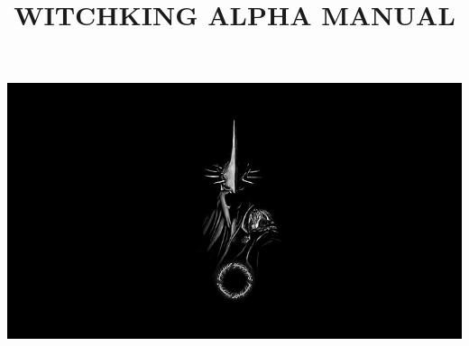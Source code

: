 \documentclass[11pt]{report}
\title{\uppercase{\textbf{WitchKing Alpha Manual}}}								%
\makeatletter
\let\thetitle\@title
\makeatother
\begin{document}

\begin{titlepage}
	\centering
    \vspace*{0.5 cm}
    \includegraphics[scale = 0.5]{figures/witch_king_logo.jpg}
	{\Large \bfseries \thetitle}\\
	\centering
	\vspace{2cm}
    \\
    \\
	
	
    
    
    
    
	
\end{titlepage}







\end{document}
